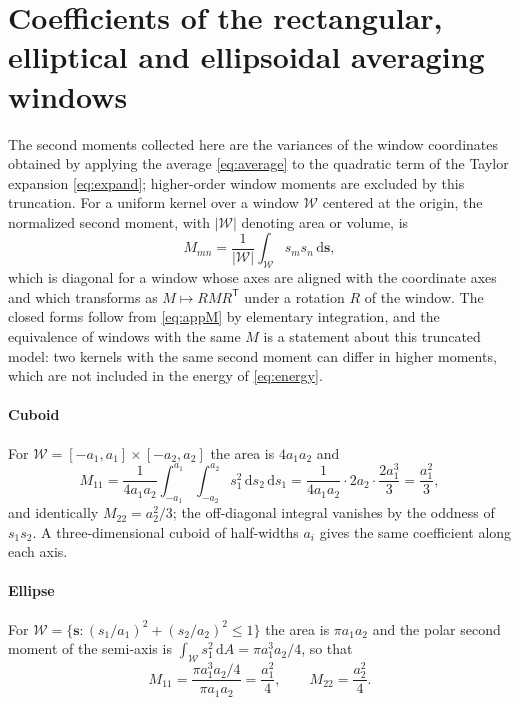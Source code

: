 \FloatBarrier
\section{Coefficients of the rectangular, elliptical and ellipsoidal averaging
windows}
\label{app:Mcoeff}
\setcounter{table}{0}
\setcounter{figure}{0}

The second moments collected here are the variances of the window coordinates
obtained by applying the average \eqref{eq:average} to the quadratic term of the
Taylor expansion \eqref{eq:expand}; higher-order window moments are excluded by this truncation. For a uniform kernel over a window $\mathcal{W}$ centered at
the origin, the normalized second moment, with $|\mathcal W|$ denoting area or volume, is
\begin{equation}
  M_{mn} = \frac{1}{|\mathcal{W}|}\int_{\mathcal W} s_m s_n \,\mathrm{d}\bm{s},
  \label{eq:appM}
\end{equation}
which is diagonal for a window whose axes are aligned with the coordinate axes
and which transforms as $M\mapsto RMR^{\mathsf T}$ under a rotation $R$ of the
window. The closed forms follow from
\eqref{eq:appM} by elementary integration, and the equivalence of windows with
the same $M$ is a statement about this truncated model: two kernels with the
same second moment can differ in higher moments, which are not included in the energy of \eqref{eq:energy}.

\paragraph{Cuboid} For $\mathcal W=[-a_1,a_1]\times[-a_2,a_2]$ the area is
$4a_1a_2$ and
\begin{equation}
  M_{11} = \frac{1}{4a_1a_2}\int_{-a_1}^{a_1}\!\!\int_{-a_2}^{a_2}
           s_1^{2}\,\mathrm{d}s_2\,\mathrm{d}s_1
         = \frac{1}{4a_1a_2}\cdot 2a_2\cdot\frac{2a_1^{3}}{3}
         = \frac{a_1^{2}}{3},
  \label{eq:Mcub}
\end{equation}
and identically $M_{22}=a_2^{2}/3$; the off-diagonal integral vanishes by the
oddness of $s_1s_2$. A three-dimensional cuboid of half-widths $a_i$ gives the
same coefficient along each axis.

\paragraph{Ellipse} For $\mathcal W=\{\bm{s}: (s_1/a_1)^{2}+(s_2/a_2)^{2}\le1\}$ the
area is $\pi a_1a_2$ and the polar second moment of the semi-axis is
$\int_{\mathcal W}s_1^{2}\,\mathrm{d}A = \pi a_1^{3}a_2/4$, so that
\begin{equation}
  M_{11} = \frac{\pi a_1^{3}a_2/4}{\pi a_1a_2} = \frac{a_1^{2}}{4},
  \qquad M_{22}=\frac{a_2^{2}}{4}.
  \label{eq:Mell}
\end{equation}

